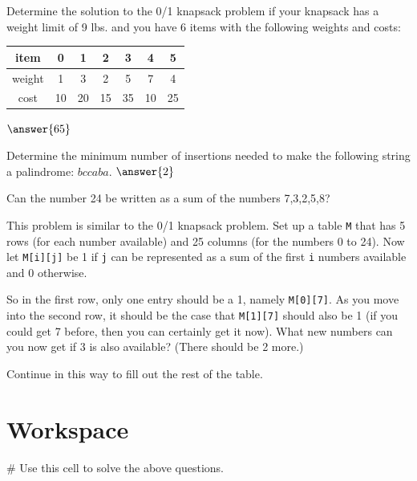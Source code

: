 \documentclass{ximera}
\begin{document}
\begin{question}
Determine the solution to the 0/1 knapsack problem if your knapsack has a weight limit of 9 lbs. and you have 6 items with the following weights and costs:
	\begin{center}
		\begin{tabular}{|c|c|c|c|c|c|c|}
			\hline
			item & 0 & 1 & 2 & 3 & 4 & 5\\
			\hline
			\hline
			weight & 1 & 3 & 2 & 5 & 7 & 4\\
			\hline
			cost & 10 & 20 & 15 & 35 & 10 & 25\\
			\hline
	\end{tabular}
	\end{center}

	$\answer{65}$
\end{question}

\begin{question}
Determine the minimum number of insertions needed to make the following string a palindrome: $bccaba$. $\answer{2}$
\end{question}

\begin{question}
Can the number 24 be written as a sum of the numbers 7,3,2,5,8?
	\begin{hint}
This problem is similar to the 0/1 knapsack problem. Set up a table \verb|M| that has 5 rows (for each number available) and 25 columns (for the numbers 0 to 24). Now let \verb|M[i][j]| be 1 if \verb|j| can be represented as a sum of the first \verb|i| numbers available and 0 otherwise.

So in the first row, only one entry should be a 1, namely \verb|M[0][7]|. As you move into the second row, it should be the case that \verb|M[1][7]| should also be 1 (if you could get 7 before, then you can certainly get it now). What new numbers can you now get if 3 is also available? (There should be 2 more.)

Continue in this way to fill out the rest of the table.
	\end{hint}
	\begin{multipleChoice}
	\end{multipleChoice}
\end{question}

\section{Workspace}

\begin{sageCell}
# Use this cell to solve the above questions.
\end{sageCell}
\end{document}
